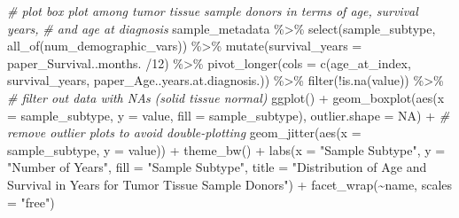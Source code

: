 \documentclass[
]{article}
\newenvironment{Shaded}{\begin{snugshade}}{\end{snugshade}}
\newcommand{\AttributeTok}[1]{\textcolor[rgb]{0.77,0.63,0.00}{#1}}
\newcommand{\CommentTok}[1]{\textcolor[rgb]{0.56,0.35,0.01}{\textit{#1}}}
\newcommand{\ConstantTok}[1]{\textcolor[rgb]{0.00,0.00,0.00}{#1}}
\newcommand{\DecValTok}[1]{\textcolor[rgb]{0.00,0.00,0.81}{#1}}
\newcommand{\FunctionTok}[1]{\textcolor[rgb]{0.00,0.00,0.00}{#1}}
\newcommand{\NormalTok}[1]{#1}
\newcommand{\SpecialCharTok}[1]{\textcolor[rgb]{0.00,0.00,0.00}{#1}}
\newcommand{\StringTok}[1]{\textcolor[rgb]{0.31,0.60,0.02}{#1}}
\begin{document}
\newpage

\begin{Shaded}
\begin{Highlighting}[]
\CommentTok{\# plot box plot among tumor tissue sample donors in terms of age, survival years, }
\CommentTok{\# and age at diagnosis}
\NormalTok{sample\_metadata }\SpecialCharTok{\%\textgreater{}\%} 
  \FunctionTok{select}\NormalTok{(sample\_subtype, }\FunctionTok{all\_of}\NormalTok{(num\_demographic\_vars)) }\SpecialCharTok{\%\textgreater{}\%} 
  \FunctionTok{mutate}\NormalTok{(}\AttributeTok{survival\_years =}\NormalTok{ paper\_Survival..months. }\SpecialCharTok{/}\DecValTok{12}\NormalTok{) }\SpecialCharTok{\%\textgreater{}\%} 
  \FunctionTok{pivot\_longer}\NormalTok{(}\AttributeTok{cols =} \FunctionTok{c}\NormalTok{(age\_at\_index, survival\_years, paper\_Age..years.at.diagnosis.)) }\SpecialCharTok{\%\textgreater{}\%} 
  \FunctionTok{filter}\NormalTok{(}\SpecialCharTok{!}\FunctionTok{is.na}\NormalTok{(value)) }\SpecialCharTok{\%\textgreater{}\%} \CommentTok{\# filter out data with NAs (solid tissue normal)}
  \FunctionTok{ggplot}\NormalTok{() }\SpecialCharTok{+}
  \FunctionTok{geom\_boxplot}\NormalTok{(}\FunctionTok{aes}\NormalTok{(}\AttributeTok{x =}\NormalTok{ sample\_subtype, }\AttributeTok{y =}\NormalTok{ value, }\AttributeTok{fill =}\NormalTok{ sample\_subtype),}
               \AttributeTok{outlier.shape =} \ConstantTok{NA}\NormalTok{) }\SpecialCharTok{+} \CommentTok{\# remove outlier plots to avoid double{-}plotting}
  \FunctionTok{geom\_jitter}\NormalTok{(}\FunctionTok{aes}\NormalTok{(}\AttributeTok{x =}\NormalTok{ sample\_subtype, }\AttributeTok{y =}\NormalTok{ value)) }\SpecialCharTok{+}
  \FunctionTok{theme\_bw}\NormalTok{() }\SpecialCharTok{+}
  \FunctionTok{labs}\NormalTok{(}\AttributeTok{x =} \StringTok{"Sample Subtype"}\NormalTok{, }\AttributeTok{y =} \StringTok{"Number of Years"}\NormalTok{, }\AttributeTok{fill =} \StringTok{"Sample Subtype"}\NormalTok{,}
       \AttributeTok{title =} \StringTok{"Distribution of Age and Survival in Years for Tumor Tissue Sample Donors"}\NormalTok{) }\SpecialCharTok{+}
  \FunctionTok{facet\_wrap}\NormalTok{(}\SpecialCharTok{\textasciitilde{}}\NormalTok{name, }\AttributeTok{scales =} \StringTok{"free"}\NormalTok{)}
\end{Highlighting}
\end{Shaded}
\end{document}
